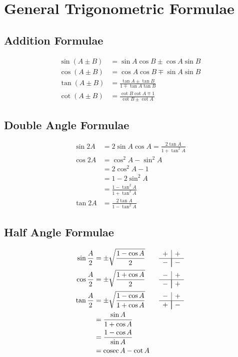 \documentclass[12pt]{article}
\title{}
\author{}
\date{}
\newcommand{\ppmm}{\begin{array}{c|c}+&+\\\hline\\[-12pt]-&-\end{array}}
\newcommand{\pmpm}{\begin{array}{c|c}-&+\\\hline\\[-12pt]+&-\end{array}}
\newcommand{\pmmp}{\begin{array}{c|c}-&+\\\hline\\[-12pt]-&+\end{array}}
\DeclareMathOperator{\cosec}{cosec}
\newcommand{\pwidth}{0.46\linewidth}
\begin{document}
	
	\maketitle
	
	\section{General Trigonometric Formulae}
	
	\begin{minipage}[t]{\pwidth}
		\subsection{Addition Formulae}
		\begin{align}
			\sin(A \pm B) &= \sin A \cos B \pm \cos A \sin B \\
			\cos(A \pm B) &= \cos A \cos B \mp \sin A \sin B \\
			\tan(A \pm B) &= \frac{\tan A \pm \tan B}{1 \mp \tan A \tan B} \\
			\cot(A \pm B) &= \frac{\cot B \cot A \mp 1}{\cot B \pm \cot A}
		\end{align}
		
		\subsection{Double Angle Formulae}
		\begin{align}
			\sin 2A &= 2 \sin A \cos A = \frac{2 \tan A}{1 + \tan^2A} \\
			\cos 2A &= \cos^2A - \sin^2A \nonumber \\ &= 2\cos^2A - 1 \nonumber\\ &= 1 - 2\sin^2A \nonumber\\ &= \frac{1-\tan^2A}{1 + \tan^2A} \\
			\tan 2A &= \frac{2\tan A}{1- \tan^2A}
		\end{align}
		
		\subsection{Half Angle Formulae}
		\begin{align}
			\sin \frac A2 &= \pm \sqrt{\frac{1-\cos A}{2}} \qquad \ppmm \\
			\cos \frac A2 &= \pm \sqrt{\frac{1+\cos A}{2}} \qquad \pmmp \\
			\tan \frac A2 &= \pm \sqrt{\frac{1-\cos A}{1+\cos A}} \qquad \pmpm \nonumber\\	&= \frac{\sin A}{1+\cos A} \nonumber\\ &= \frac{1-\cos A}{\sin A} \nonumber\\ &= \cosec A - \cot A
		\end{align}
	\end{minipage}%
\end{document}
